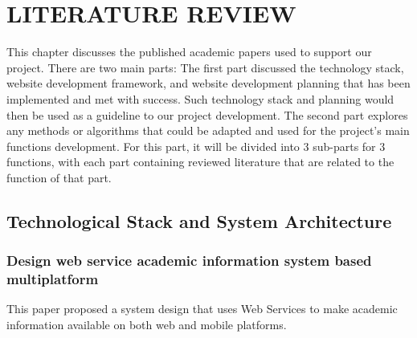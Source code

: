 \chapter{LITERATURE REVIEW}


\newcommand{\funcgroup}[1]{%
	\vspace{\baselineskip}%
	\noindent{\bfseries\fontsize{12}{14.4}\selectfont #1}%
	\vspace{0.1pt}\par%
}

This chapter discusses the published academic papers used to support our project. There are two main parts: The first part discussed the technology stack, website development framework, and website development planning that has been implemented and met with success. Such technology stack and planning would then be used as a guideline to our project development. The second part explores any methods or algorithms that could be adapted and used for the project’s main functions development. For this part, it will be divided into 3 sub-parts for 3 functions, with each part containing reviewed literature that are related to the function of that part.

\section{Technological Stack and System Architecture}

\subsection{Design web service academic information system based multiplatform \cite{paper_10}}

This paper proposed a system design that uses Web Services to make academic information available on both web and mobile platforms.

